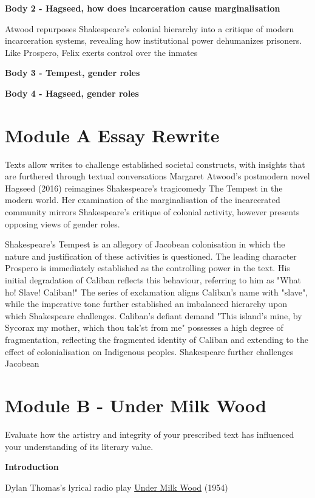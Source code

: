 	\textbf{Body 2 - Hagseed, how does incarceration cause marginalisation}

	Atwood repurposes Shakespeare’s colonial hierarchy into a critique of modern incarceration systems, revealing how institutional power dehumanizes prisoners. Like Prospero, Felix exerts control over the inmates 

	\textbf{Body 3 - Tempest, gender roles}
	
	\textbf{Body 4 - Hagseed, gender roles}



\section{Module A Essay Rewrite}
	
	Texts allow writes to challenge established societal constructs, with insights that are furthered through textual conversations Margaret Atwood's postmodern novel Hagseed (2016) reimagines Shakespeare's tragicomedy The Tempest in the modern world. Her examination of the marginalisation of the incarcerated community mirrors Shakespeare's critique of colonial activity, however presents opposing views of gender roles.

	Shakespeare's Tempest is an allegory of Jacobean colonisation in which the nature and justification of these activities is questioned. The leading character Prospero is immediately established as the controlling power in the text. His initial degradation of Caliban reflects this behaviour, referring to him as "What ho! Slave! Caliban!" The series of exclamation aligns Caliban's name with "slave", while the imperative tone further established an imbalanced hierarchy upon which Shakespeare challenges. Caliban's defiant demand "This island's mine, by Sycorax my mother, which thou tak'st from me" possesses a high degree of fragmentation, reflecting the fragmented identity of Caliban and extending to the effect of colonialisation on Indigenous peoples. Shakespeare further challenges Jacobean

\section{Module B - Under Milk Wood}

	Evaluate how the artistry and integrity of your prescribed text has influenced your understanding of its literary
value.
	
	\textbf{Introduction}
	
		Dylan Thomas's lyrical radio play \underline{Under Milk Wood} (1954) 
